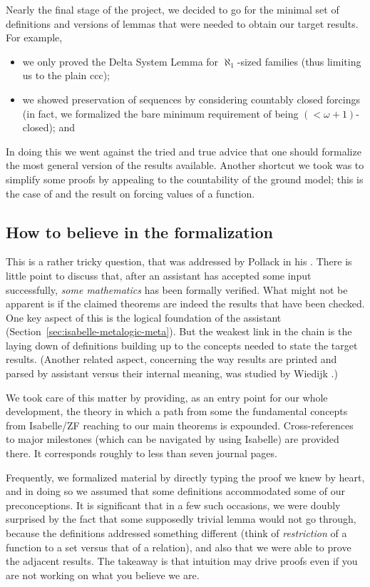 Nearly the final stage of the project, we decided to go for the minimal
set of definitions and versions of lemmas that were needed to obtain
our target results. For example,
\begin{itemize}
\item
  we only proved the Delta System Lemma for $\aleph_1$-sized families
  (thus limiting us to the plain ccc);
\item we showed preservation of sequences by considering countably
  closed forcings (in fact, we formalized the bare minimum requirement
  of being $(<\omega+1)$-closed); and
\end{itemize}
In doing this we went against the tried and
true advice that one should formalize the most general version of the
results available. Another shortcut we took was to
simplify some proofs by appealing to the countability of the ground
model; this is the case of
 and the result on forcing
values of a function.

\subsection{How to believe in the formalization}
This is a rather tricky question, that was addressed by Pollack in his
\cite{MR1686867}. There is little point to discuss that, after an
assistant has accepted some input successfully, \emph{some
mathematics} has been formally verified. What might not be apparent is
if the claimed theorems are indeed the results that have been
checked. One key aspect of this is the logical foundation of the
assistant (Section~\ref{sec:isabelle-metalogic-meta}). But the weakest
link in the chain is the laying down of definitions building up to the
concepts needed to state the target results. (Another related aspect,
concerning the way results are printed and parsed by assistant versus
their internal meaning, was studied by Wiedijk \cite{zbMATH06319597}.)

We took care of this matter by providing, as an entry point for our
whole development, the theory  in which a
path from some the fundamental concepts from Isabelle/ZF reaching to our main theorems
is expounded. Cross-references to major milestones (which can be
navigated by using Isabelle) are provided there. It
corresponds roughly to less than seven journal pages.

Frequently, we formalized material by directly typing the proof we
knew by heart, and in doing so we assumed that some definitions
accommodated some of our preconceptions.
It is significant that in a few such occasions, we were doubly
surprised by the fact that some supposedly trivial lemma would not go
through, because the definitions addressed something different (think
of \emph{restriction} of a function to a set versus that of a
relation), and also that we were able to prove the adjacent
results. The takeaway is that intuition may drive proofs
even if you are not working on what you believe we are.

